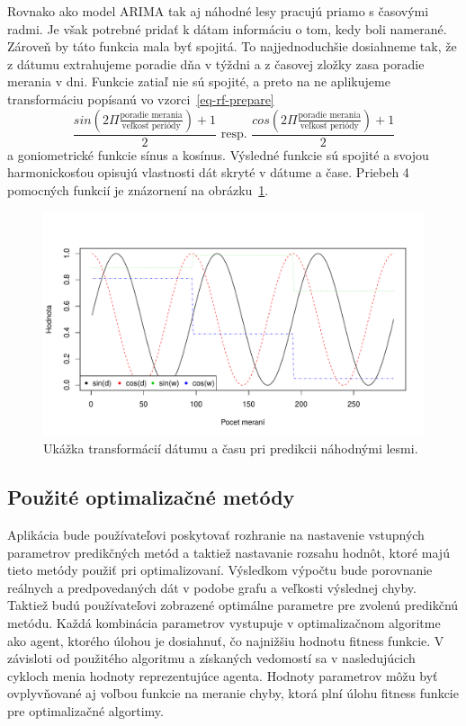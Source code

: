 \documentclass[a4paper,slovak,12pt,appendix]{article}
\begin{document}
Rovnako ako model ARIMA tak aj náhodné lesy pracujú priamo s časovými radmi.
Je však potrebné pridať k dátam informáciu o tom, kedy boli namerané. Zároveň
by táto funkcia mala byť spojitá. To najjednoduchšie dosiahneme tak, že z dátumu
extrahujeme poradie dňa v týždni a z časovej zložky zasa poradie merania v dni.
Funkcie zatiaľ nie sú spojité, a preto na ne aplikujeme transformáciu popísanú
vo vzorci~\ref{eq-rf-prepare}~\cite{Laurinec2017}
\begin{equation}
  \frac{sin(2\Pi \frac{\text{poradie merania}}{\text{veľkosť periódy}}) + 1}{2} \text{  resp.  } \frac{cos(2\Pi \frac{\text{poradie merania}}{\text{veľkosť periódy}}) + 1}{2}
  \label{eq-rf-prepare}
\end{equation}
a goniometrické funkcie sínus a kosínus. Výsledné funkcie sú spojité a svojou
harmonickosťou opisujú vlastnosti dát skryté v dátume a čase. Priebeh 4 pomocných
funkcií je znázornení na obrázku~\ref{fig-rf-prepare}.

\begin{figure}[ht]
  \centering
  \includegraphics[width=\textwidth]{random_forest_preparation.pdf}
  \caption{Ukážka transformácií dátumu a času pri predikcii náhodnými lesmi.}
  \label{fig-rf-prepare}
\end{figure}


\subsection{Použité optimalizačné metódy}
Aplikácia bude používateľovi poskytovať rozhranie na nastavenie vstupných
parametrov predikčných metód a taktiež nastavanie rozsahu hodnôt, ktoré majú
tieto metódy použiť pri optimalizovaní. Výsledkom výpočtu bude porovnanie
reálnych a predpovedaných dát v podobe grafu a veľkosti výslednej chyby.
Taktiež budú používateľovi zobrazené optimálne parametre pre zvolenú predikčnú
metódu. Každá kombinácia parametrov vystupuje v optimalizačnom algoritme ako
agent, ktorého úlohou je dosiahnuť, čo najnižšiu hodnotu fitness funkcie.
V závisloti od použitého algoritmu a získaných vedomostí sa v nasledujúcich
cykloch menia hodnoty reprezentujúce agenta. Hodnoty parametrov môžu byť
ovplyvňované aj voľbou funkcie na meranie chyby, ktorá plní úlohu fitness
funkcie pre optimalizačné algortimy.
\end{document}
